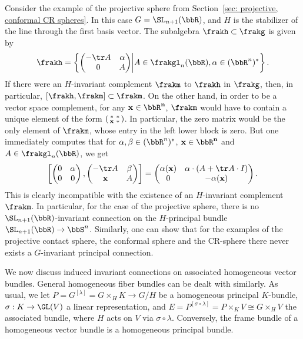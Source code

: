\begin{example}\label{ex 1.4.6(2) Cap}
    Consider the example of the projective sphere from Section~\ref{sec: projective, conformal CR spheres}. In this case $G=\SL_{n+1}(\bbR)$, and $H$ is the stabilizer of the line through the first basis vector. The subalgebra $\frakh\subset \frakg$ is given by 
    \[\frakh=\left\{\begin{pmatrix}-\tr A& \alpha\\ 0&A\end{pmatrix}\middle| A\in\frakgl_n(\bbR),\alpha\in(\bbR^n)^\ast\right\}.\]
    If there were an $H$-invariant complement $\frakm$ to $\frakh$ in $\frakg$, then, in particular, $[\frakh,\frakm]\subset\frakm$. On the other hand, in order to be a vector space complement, for any $\bf{x}\in\bbR^n$, $\frakm$ would have to contain a unique element of the form $\left(\begin{smallmatrix}
        \ast &\ast\\\bf{x}&\ast
    \end{smallmatrix}\right)$. In particular, the zero matrix would be the only element of $\frakm$, whose entry in the left lower block is zero. But one immediately computes that for $\alpha,\beta\in(\bbR^n)^\ast$, $\bf{x}\in\bbR^n$ and $A\in\frakgl_n(\bbR)$, we get 
    \[\left[\begin{pmatrix}
        0&\alpha\\0&0
    \end{pmatrix},
    \begin{pmatrix}
        -\tr A&\beta\\
        \bf{x}&A
    \end{pmatrix}
    \right]
    =
    \begin{pmatrix}
        \alpha(\bf{x})& \alpha\cdot (A+\tr A\cdot I)\\
        0& -\alpha(\bf{x})
    \end{pmatrix}.
    \]
    This is clearly incompatible with the existence of an $H$-invariant complement $\frakm$. In particular, for the case of the projective sphere, there is no $\SL_{n+1}(\bbR)$-invariant connection on the $H$-principal bundle $\SL_{n+1}(\bbR)\to \bbS^n$. Similarly, one can show that for the examples of the projective contact sphere, the conformal sphere and the CR-sphere there never exists a $G$-invariant principal connection.
\end{example}






We now discuss induced invariant connections on associated homogeneous vector bundles. General homogeneous fiber bundles can be dealt with similarly. As usual, we let $P=G^{[\lambda]}=G\times_H K\to G\slash H$ be a homogeneous principal $K$-bundle, $\sigma:K\to \GL(V)$ a linear representation, and $E=P^{[\sigma\circ\lambda]}=P\times_K V\cong G\times_H V$ the associated bundle, where $H$ acts on $V$ via $\sigma\circ\lambda$. Conversely, the frame bundle of a homogeneous vector bundle is a homogeneous principal bundle. 

